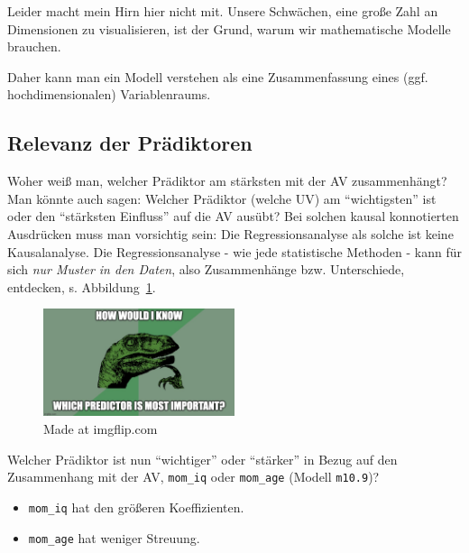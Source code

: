 \documentclass[
  a4paper,
  DIV=11]{scrreprt}
\providecommand{\tightlist}{%
  \setlength{\itemsep}{0pt}\setlength{\parskip}{0pt}}\usepackage{longtable,booktabs,array}
\theoremstyle{definition}
\theoremstyle{remark}
\begin{document}
Leider macht mein Hirn hier nicht mit. Unsere Schwächen, eine große Zahl
an Dimensionen zu visualisieren, ist der Grund, warum wir mathematische
Modelle brauchen.

Daher kann man ein Modell verstehen als eine Zusammenfassung eines (ggf.
hochdimensionalen) Variablenraums.

\hypertarget{relevanz-der-pruxe4diktoren}{%
\subsection{Relevanz der
Prädiktoren}\label{relevanz-der-pruxe4diktoren}}

Woher weiß man, welcher Prädiktor am stärksten mit der AV zusammenhängt?
Man könnte auch sagen: Welcher Prädiktor (welche UV) am ``wichtigsten''
ist oder den ``stärksten Einfluss'' auf die AV ausübt? Bei solchen
kausal konnotierten Ausdrücken muss man vorsichtig sein: Die
Regressionsanalyse als solche ist keine Kausalanalyse. Die
Regressionsanalyse - wie jede statistische Methoden - kann für sich
\emph{nur Muster in den Daten}, also Zusammenhänge bzw. Unterschiede,
entdecken, s. Abbildung~\ref{fig-how-would-i-know}.

\begin{figure}

{\centering \includegraphics[width=0.5\textwidth,height=\textheight]{./img/5sps62.jpg}

}

\caption{\label{fig-how-would-i-know}Made at imgflip.com}

\end{figure}

Welcher Prädiktor ist nun ``wichtiger'' oder ``stärker'' in Bezug auf
den Zusammenhang mit der AV, \texttt{mom\_iq} oder \texttt{mom\_age}
(Modell \texttt{m10.9})?

\begin{itemize}
\tightlist
\item
  \texttt{mom\_iq} hat den größeren Koeffizienten.
\item
  \texttt{mom\_age} hat weniger Streuung.
\end{itemize}
\end{document}
